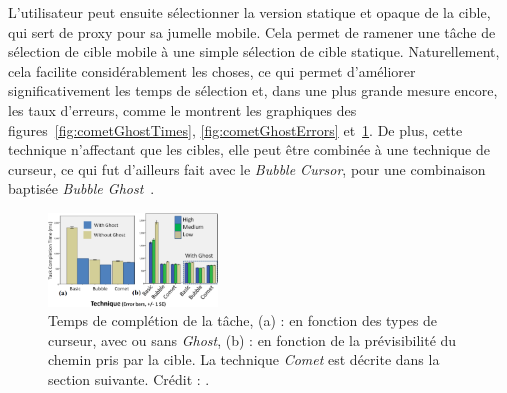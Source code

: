 	L'utilisateur peut ensuite sélectionner la version statique et opaque de la cible, qui sert de proxy pour sa jumelle mobile. Cela permet de ramener une tâche de sélection de cible mobile à une simple sélection de cible statique. Naturellement, cela facilite considérablement les choses, ce qui permet d'améliorer significativement les temps de sélection et, dans une plus grande mesure encore, les taux d'erreurs, comme le montrent les graphiques des figures~\ref{fig:cometGhostTimes}, \ref{fig:cometGhostErrors} et~\ref{fig:cometGhostPredictability}. De plus, cette technique n'affectant que les cibles, elle peut être combinée à une technique de curseur, ce qui fut d'ailleurs fait avec le \emph{Bubble Cursor}, pour une combinaison baptisée \emph{Bubble Ghost}~\cite{hasan2011comet}.

	\begin{figure}
		\centering
		\includegraphics[width=0.4\textwidth]{figures/ch2/cometGhostPredictability}
		\caption[\emph{Comet/Ghost}, prévisibilité et résultats]{Temps de complétion de la tâche, (a) : en fonction des types de curseur, avec ou sans \emph{Ghost}, (b) : en fonction de la prévisibilité du chemin pris par la cible. La technique \emph{Comet} est décrite dans la section suivante. Crédit : \cite{hasan2011comet}.}
		\label{fig:cometGhostPredictability}
	\end{figure}
	
	
	
	

